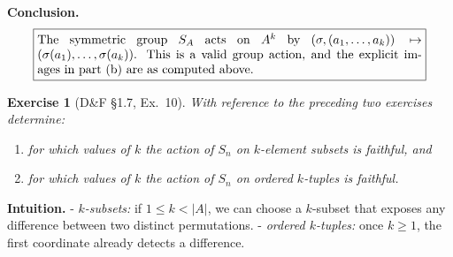 \documentclass[12pt]{article}
\newtheorem{exercise}[theorem]{Exercise}
\theoremstyle{definition}
\begin{document}
\noindent\textbf{Conclusion.}
\[
\boxed{\parbox{0.9\linewidth}{
The symmetric group $S_A$ acts on $A^k$ by
$(\sigma,(a_1,\dots,a_k))\mapsto(\sigma(a_1),\dots,\sigma(a_k))$.
This is a valid group action, and the explicit images in part (b) are as computed above.
}}
\]

\newpage

\begin{exercise}[D\&F §1.7, Ex.~10]
With reference to the preceding two exercises determine:
\begin{enumerate}
\item[(a)] for which values of $k$ the action of $S_n$ on $k$-element subsets is faithful, and
\item[(b)] for which values of $k$ the action of $S_n$ on ordered $k$-tuples is faithful.
\end{enumerate}
\end{exercise}

\dotfill

\noindent\textbf{Intuition.}
- \emph{$k$-subsets:} if $1\le k<|A|$, we can choose a $k$-subset that exposes any difference between two distinct permutations.
- \emph{ordered $k$-tuples:} once $k\ge1$, the first coordinate already detects a difference.

\dotfill
\end{document}
